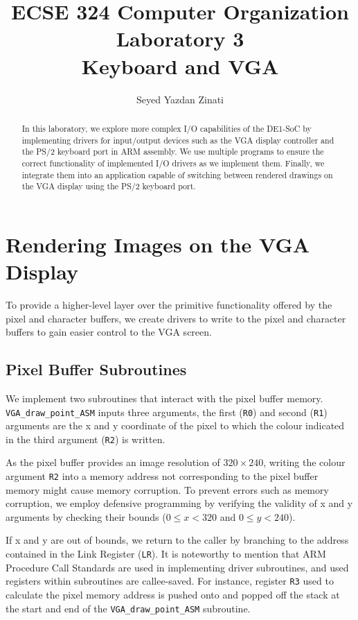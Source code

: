 \documentclass[11pt]{article}
\begin{document}
\title{\textbf{ECSE 324 Computer Organization}\\
    Laboratory 3\\
    Keyboard and VGA
}

\author{Seyed Yazdan Zinati}
\maketitle

\begin{abstract}
    In this laboratory, we explore more complex I/O capabilities of the DE1-SoC by implementing drivers for input/output devices such as the VGA display controller and the PS/2 keyboard port in ARM assembly. We use multiple programs to ensure the correct functionality of implemented I/O drivers as we implement them. Finally, we integrate them into an application capable of switching between rendered drawings on the VGA display using the PS/2 keyboard port.
\end{abstract}

\section{Rendering Images on the VGA Display}
To provide a higher-level layer over the primitive functionality offered by the pixel and character buffers, we create drivers to write to the pixel and character buffers to gain easier control to the VGA screen.
\subsection{Pixel Buffer Subroutines}
We implement two subroutines that interact with the pixel buffer memory. \verb+VGA_draw_point_ASM+ inputs three arguments, the first (\verb+R0+) and second (\verb+R1+) arguments are the x and y coordinate of the pixel to which the colour indicated in the third argument (\verb+R2+) is written.

As the pixel buffer provides an image resolution of $320\times 240$, writing the colour argument \verb+R2+ into a memory address not corresponding to the pixel buffer memory might cause memory corruption. To prevent errors such as memory corruption, we employ defensive programming by verifying the validity of x and y arguments by checking their bounds ($0\leq x < 320$ and $0\leq y <240$).

If x and y are out of bounds, we return to the caller by branching to the address contained in the Link Register (\verb+LR+). It is noteworthy to mention that ARM Procedure Call Standards are used in implementing driver subroutines, and used registers within subroutines are callee-saved. For instance, register \verb+R3+ used to calculate the pixel memory address is pushed onto and popped off the stack at the start and end of the \verb+VGA_draw_point_ASM+ subroutine.
\end{document}
